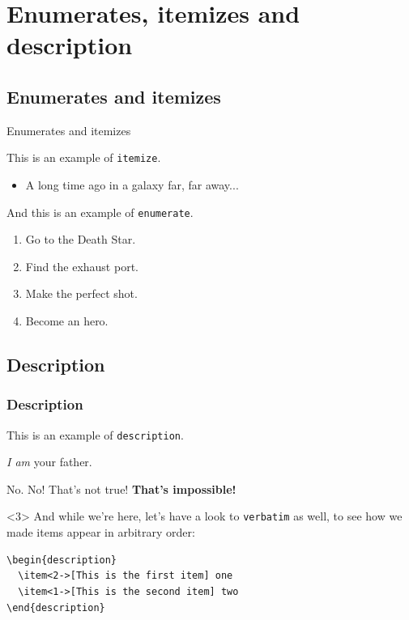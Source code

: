\documentclass{article}
\begin{document}
\section{Enumerates, itemizes and description}

\subsection{Enumerates and itemizes}

\begin{frame}{Enumerates and itemizes}

This is an example of \texttt{itemize}.
\begin{itemize}
	\item A long time ago in a galaxy far, far away...
\end{itemize}
And this is an example of \texttt{enumerate}.

\begin{enumerate} 
  \item Go to the Death Star.
  \item Find the exhaust port.
  \item Make the perfect shot.
  \item Become an hero.
\end{enumerate}
\end{frame}

\subsection{Description}

\begin{frame}[fragile]
\frametitle{Description}
This is an example of \texttt{description}.

\begin{description}
\item<2->[Vader] \emph{I am} your father.
\item<1->[Luke] No. No! That's not true! \textbf{That's impossible!}
\end{description}

\begin{uncoverenv}<3>
  \vskip 0.5cm
  And while we're here, let's have a look to \texttt{verbatim} as well, to see how we made items appear in arbitrary order:
  \vskip 0.5cm
  \begin{verbatim}
\begin{description}
  \item<2->[This is the first item] one
  \item<1->[This is the second item] two
\end{description}
  \end{verbatim}
\end{uncoverenv}

\end{frame}
\end{document}
